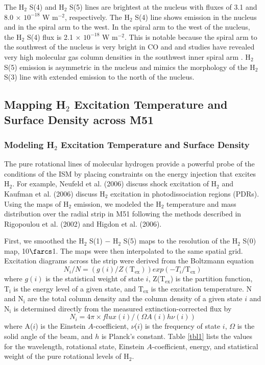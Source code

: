 \documentclass[12pt,preprint]{aastex}
\begin{document}
The H$_2$ S(4) and H$_2$ S(5) lines are brightest at
the nucleus with fluxes of 3.1 and 8.0 $\times$
$\mathrm{10^{-18}}$ W $\mathrm{m^{-2}}$, respectively.  The H$_2$
S(4) line shows emission in the nucleus and in the spiral arm to the
west.  In the spiral arm to the west of the nucleus, the
H$_2$ S(4) flux is 2.1 $\times$ $\mathrm{10^{-18}}$ W
$\mathrm{m^{-2}}$.  This is notable because the spiral arm to the
southwest of the nucleus is very bright in CO and and studies have
revealed very high molecular gas column densities in the southwest
inner spiral arm \citep{lor90, aal99}.  H$_2$ S(5) emission is
asymmetric in the nucleus and mimics the morphology of the
H$_2$ S(3) line with extended emission to the north of the
nucleus.

\subsection{Mapping H$_2$ Excitation Temperature and Surface Density across M51}

\subsubsection{Modeling H$_2$ Excitation Temperature and Surface Density}

The pure rotational lines of molecular hydrogen provide a powerful
probe of the conditions of the ISM by placing constraints on the
energy injection that excites H$_2$.  For example, 
Neufeld et al. (2006) discuss shock excitation of H$_2$ and 
Kaufman et al. (2006) discuss H$_2$ excitation in photodissociation regions (PDRs).  
Using the maps of H$_2$ emission, we modeled the H$_2$ 
temperature and mass distribution over the radial strip in M51 
following the methods described in Rigopoulou et al. (2002) 
and Higdon et al. (2006).

First, we smoothed the H$_2$ S(1) $-$ H$_2$ S(5)
maps to the resolution of the H$_2$ S(0) map, 10$\farcs$1.
The maps were then interpolated to the same spatial grid.  Excitation
diagrams across the strip were derived from the Boltzmann equation
\begin{equation}
N_i/N = (g(i)/Z(\mathrm{T_{ex}}))exp(-T_i/\mathrm{T_{ex}})
\end{equation}
where $g(i)$ is the statistical weight of state $i$,
Z($\mathrm{T_{ex}}$) is the partition function, $\mathrm{T_i}$ is the
energy level of a given state, and $\mathrm{T_{ex}}$ is the excitation
temperature.  N and $\mathrm{N_i}$ are the total column density and
the column density of a given state $i$ and $\mathrm{N_i}$ is
determined directly from the measured extinction-corrected flux by
\begin{equation}
N_i = 4 \pi \times flux(i)/(\Omega A(i)h\nu (i))
\end{equation}
where A($i$) is the Einstein $A$-coefficient, $\nu$($i$) is the
frequency of state $i$, $\Omega$ is the solid angle of the beam, and
$h$ is Planck's constant.  Table \ref{tbl1} lists the values for the
wavelength, rotational state, Einstein $A$-coefficient, energy, and
statistical weight of the pure rotational levels of H$_2$.
\end{document}
